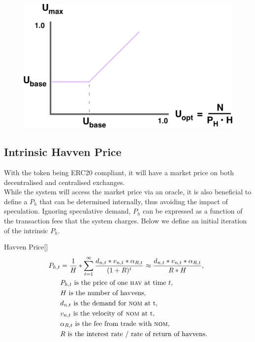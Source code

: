 \begin{figure}[h!]
    \centering
    \includegraphics[width=.75\textwidth]{img/U_max}
\end{figure}

\newpage

\subsection{Intrinsic Havven Price} With the \HAV{} token being ERC20 compliant, it will have a market price on both decentralised and centralised exchanges. \\

\noindent While the system will access the market price via an oracle, it is also beneficial to define a $P_h$ that can be determined internally, thus avoiding the impact of speculation. Ignoring speculative demand, $P_h$ can be expressed as a function of the transaction fees that the system charges. Below we define an initial iteration of the intrinsic $P_h$.

\begin{namedthm}{Havven Price}[]
\begin{align*} 
P_{h,t} &= \frac{1}{H}* \sum\limits_{t=1}^\infty \frac{d_{n,t} *v_{n,t} * \alpha_{R,t}}{(1+R)^t} \approx \frac{d_{n,t} *v_{n,t} * \alpha_{R,t}}{R * H}, \\
& P_{h,t} \text{ is the price of one \textsc{hav}{} at time } t, \\
& H \text{ is the number of havvens}, \\
& d_{n,t} \text{ is the demand for \textsc{nom}{} at t}, \\
& v_{n,t} \text{ is the velocity of \textsc{nom}{} at t}, \\
& \alpha_{R,t} \text{ is the fee from trade with \textsc{nom}{}}, \\
& R \text{ is the interest rate / rate of return of havvens}. \\
\end{align*}
\end{namedthm}

